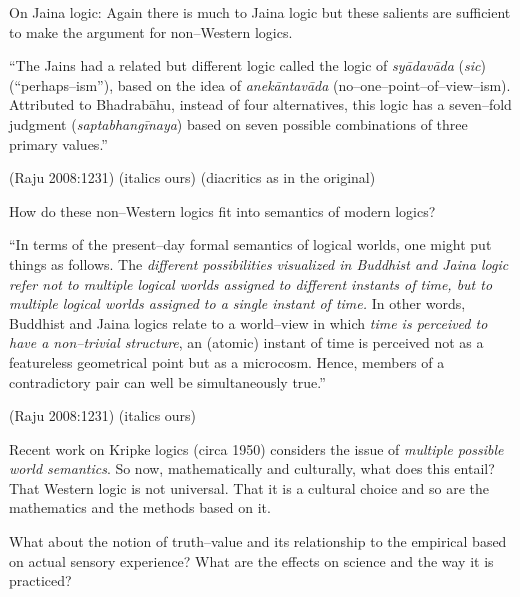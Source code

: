 On Jaina logic: Again there is much to Jaina logic but these salients are sufficient to make the argument for non–Western logics.

\begin{myquote}
“The Jains had a related but different logic called the logic of \textit{syādavāda} (\textit{sic}) (“perhaps–ism”), based on the idea of \textit{anekāntavāda} (no–one–point–of–view–ism). Attributed to Bhadrabāhu, instead of four alternatives, this logic has a seven–fold judgment (\textit{saptabhangīnaya}) based on seven possible combinations of three primary values.”
\end{myquote}

\hfill (Raju 2008:1231) (italics ours) (diacritics as in the original)

How do these non–Western logics fit into semantics of modern logics?

\begin{myquote}
“In terms of the present–day formal semantics of logical worlds, one might put things as follows. The \textit{different possibilities visualized in Buddhist and Jaina logic refer not to multiple logical worlds assigned to different instants of time, but to multiple logical worlds assigned to a single instant of time.} In other words, Buddhist and Jaina logics relate to a world–view in which \textit{time is perceived to have a non–trivial structure}, an (atomic) instant of time is perceived not as a featureless geometrical point but as a microcosm. Hence, members of a contradictory pair can well be simultaneously true.”
\end{myquote}

\hfill (Raju 2008:1231) (italics ours)

Recent work on Kripke logics (circa 1950) considers the issue of \textit{multiple possible world semantics}. So now, mathematically and culturally, what does this entail? That Western logic is not universal. That it is a cultural choice and so are the mathematics and the methods based on it.

What about the notion of truth–value and its relationship to the empirical based on actual sensory experience? What are the effects on science and the way it is practiced?


